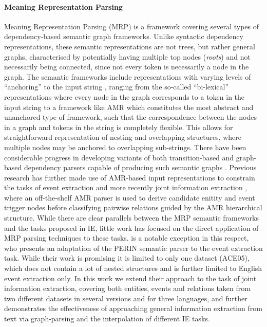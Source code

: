 \documentclass[11pt]{article}
\begin{document}
\paragraph{Meaning Representation Parsing}
Meaning Representation Parsing (MRP)  \citep{oepen2014semeval,oepen2015semeval,oepen-etal-2020-mrp} is a framework covering several types of dependency-based semantic graph frameworks. Unlike syntactic dependency representations, these semantic representations are not trees, but rather general graphs, characterised by potentially having multiple top nodes (\textit{roots}) and not necessarily being connected, since not every token is necessarily a node in the graph. 
The semantic frameworks include representations with varying levels of ``anchoring'' to the input string \citep{oepen-etal-2020-mrp}, ranging from the so-called ``bi-lexical'' representations  where every node in the graph corresponds to a token in the input string to a framework like AMR \cite{banarescu2013abstract} which constitutes the most abstract and unanchored type of framework, such that the correspondence between the nodes in a graph and tokens in the string is completely flexible.
This allows for straightforward representation of nesting and overlapping structures, where multiple nodes may be anchored to overlapping sub-strings.
There have been considerable progress in developing variants of both transition-based and graph-based dependency parsers capable of producing such semantic graphs \cite{hershcovich-etal-2017-transition, dozat-manning-2018-simpler,samuel-straka-2020-ufal}. Previous research has further made use of AMR-based input representations to constrain the tasks of event extraction \cite{huang-etal-2018-zero} and more recently joint information extraction \cite{zhang-ji-2021-abstract}, where an off-the-shelf AMR parser is used to derive candidate enitity and event trigger nodes before classifying pairwise relations guided by the AMR hierarchical structure.
While there are clear parallels between the MRP semantic frameworks and the tasks proposed in IE, little work has focused on the direct application of MRP parsing techniques to these tasks.
\citet{you2022eventgraph} is a notable exception in this respect, who presents an adaptation of the PERIN semantic parser \cite{samuel-straka-2020-ufal} to the event extraction task. While their work is promising it is limited to only one dataset (ACE05), which does not contain a lot of nested structures and is further limited to English event extraction only. In this work we extend their approach to the task of joint information extraction, covering both entities, events and relations taken from two different datasets in several versions and for three languages, and further demonstrates the effectiveness of approaching general information extraction from text via graph-parsing and the interpolation of different IE tasks.
\end{document}
